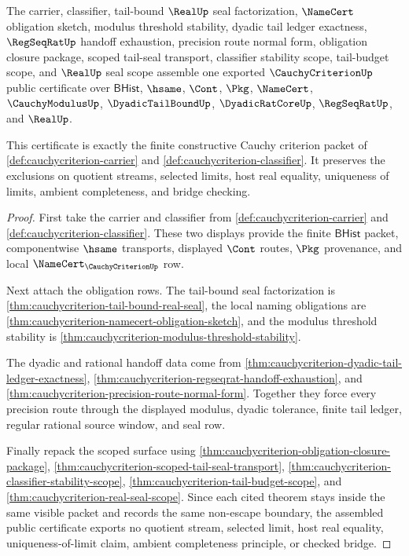 \begin{theorem}
\label{thm:cauchycriterion-public-certificate}
The carrier, classifier, tail-bound $\RealUp$ seal factorization, $\NameCert$ obligation sketch, modulus threshold stability, dyadic tail ledger exactness, $\RegSeqRatUp$ handoff exhaustion, precision route normal form, obligation closure package, scoped tail-seal transport, classifier stability scope, tail-budget scope, and $\RealUp$ seal scope assemble one exported $\CauchyCriterionUp$ public certificate over $\mathsf{BHist}$, $\hsame$, $\Cont$, $\Pkg$, $\NameCert$, $\CauchyModulusUp$, $\DyadicTailBoundUp$, $\DyadicRatCoreUp$, $\RegSeqRatUp$, and $\RealUp$.

This certificate is exactly the finite constructive Cauchy criterion packet of \autoref{def:cauchycriterion-carrier} and \autoref{def:cauchycriterion-classifier}. It preserves the exclusions on quotient streams, selected limits, host real equality, uniqueness of limits, ambient completeness, and bridge checking.
\end{theorem}
\begin{proof}
First take the carrier and classifier from \autoref{def:cauchycriterion-carrier} and \autoref{def:cauchycriterion-classifier}. These two displays provide the finite $\mathsf{BHist}$ packet, componentwise $\hsame$ transports, displayed $\Cont$ routes, $\Pkg$ provenance, and local $\NameCert_{\CauchyCriterionUp}$ row.

Next attach the obligation rows. The tail-bound seal factorization is \autoref{thm:cauchycriterion-tail-bound-real-seal}, the local naming obligations are \autoref{thm:cauchycriterion-namecert-obligation-sketch}, and the modulus threshold stability is \autoref{thm:cauchycriterion-modulus-threshold-stability}.

The dyadic and rational handoff data come from \autoref{thm:cauchycriterion-dyadic-tail-ledger-exactness}, \autoref{thm:cauchycriterion-regseqrat-handoff-exhaustion}, and \autoref{thm:cauchycriterion-precision-route-normal-form}. Together they force every precision route through the displayed modulus, dyadic tolerance, finite tail ledger, regular rational source window, and seal row.

Finally repack the scoped surface using \autoref{thm:cauchycriterion-obligation-closure-package}, \autoref{thm:cauchycriterion-scoped-tail-seal-transport}, \autoref{thm:cauchycriterion-classifier-stability-scope}, \autoref{thm:cauchycriterion-tail-budget-scope}, and \autoref{thm:cauchycriterion-real-seal-scope}. Since each cited theorem stays inside the same visible packet and records the same non-escape boundary, the assembled public certificate exports no quotient stream, selected limit, host real equality, uniqueness-of-limit claim, ambient completeness principle, or checked bridge.
\end{proof}

